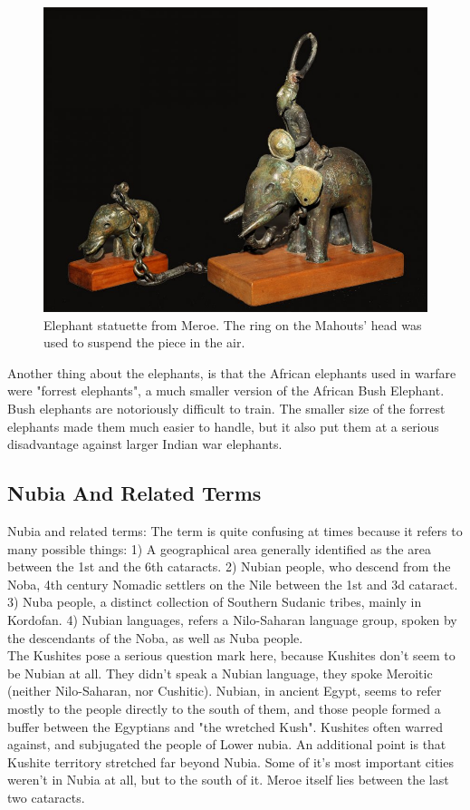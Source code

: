 \documentclass[a4paper,12pt]{scrreprt}
\begin{document}
\begin{figure}[H]
	\centering
	\includegraphics[width=\textwidth]{img/mahout_two_elephants}
	\caption{Elephant statuette from Meroe. The ring on the Mahouts' head was used to suspend the piece in the air.}
\end{figure}

Another thing about the elephants, is that the African elephants used in warfare were "forrest elephants", a much smaller version of the African Bush Elephant. Bush elephants are notoriously difficult to train. The smaller size of the forrest elephants made them much easier to handle, but it also put them at a serious disadvantage against larger Indian war elephants. 

\subsection{Nubia And Related Terms}

Nubia and related terms: The term is quite confusing at times because it refers to many possible things: 1) A geographical area generally identified as the area between the 1st and the 6th cataracts. 2) Nubian people, who descend from the Noba, 4th century Nomadic settlers on the Nile between the 1st and 3d cataract. 3) Nuba people, a distinct collection of Southern Sudanic tribes, mainly in Kordofan. 4) Nubian languages, refers a Nilo-Saharan language group, spoken by the descendants of the Noba, as well as Nuba people.\\  

The Kushites pose a serious question mark here, because Kushites don't seem to be Nubian at all. They didn't speak a Nubian language, they spoke Meroitic (neither Nilo-Saharan, nor Cushitic). Nubian, in ancient Egypt, seems to refer mostly to the people directly to the south of them, and those people formed a buffer between the Egyptians and "the wretched Kush". Kushites often warred against, and subjugated the people of Lower nubia. An additional point is that Kushite territory stretched far beyond Nubia. Some of it's most important cities weren't in Nubia at all, but to the south of it. Meroe itself lies between the last two cataracts. 
\end{document}

